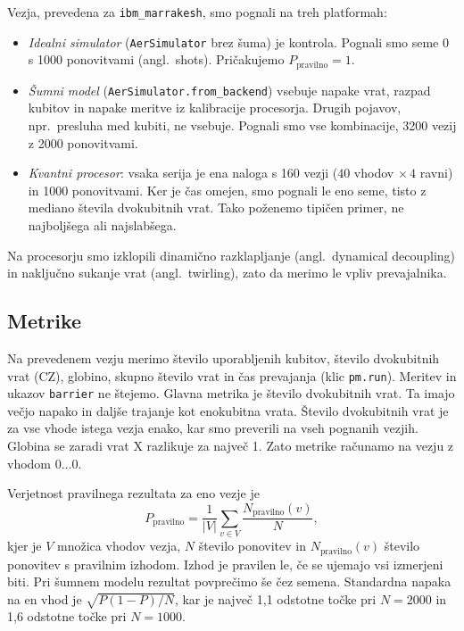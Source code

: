 \documentclass[graybox, envcountchap]{svmult}
\begin{document}
Vezja, prevedena za \texttt{ibm\_marrakesh},
smo pognali na treh platformah:
\begin{itemize}
\item \emph{Idealni simulator} (\texttt{AerSimulator} brez šuma) je kontrola.
Pognali smo seme 0 s 1000 ponovitvami (angl.\ shots).
Pričakujemo $P_\text{pravilno} = 1$.
\item \emph{Šumni model} (\texttt{AerSimulator.from\_backend})
vsebuje napake vrat, razpad kubitov in napake meritve
iz kalibracije procesorja.
Drugih pojavov, npr.\ presluha med kubiti, ne vsebuje.
Pognali smo vse kombinacije,
3200 vezij z 2000 ponovitvami.
\item \emph{Kvantni procesor}: vsaka serija je ena naloga
s 160 vezji ($40$ vhodov $\times\,4$ ravni) in 1000 ponovitvami.
Ker je čas omejen, smo pognali le eno seme,
tisto z mediano števila dvokubitnih vrat.
Tako poženemo tipičen primer, ne najboljšega ali najslabšega.
\end{itemize}
Na procesorju smo izklopili dinamično razklapljanje
(angl.\ dynamical decoupling)
in naključno sukanje vrat (angl.\ twirling), zato
da merimo le vpliv prevajalnika.


\subsection{Metrike}
\label{g10:sec:metrike}

Na prevedenem vezju merimo število uporabljenih kubitov,
število dvokubitnih vrat (CZ), globino,
skupno število vrat in čas prevajanja (klic \texttt{pm.run}).
Meritev in ukazov \texttt{barrier} ne štejemo.
Glavna metrika je število dvokubitnih vrat.
Ta imajo večjo napako in daljše trajanje kot enokubitna vrata.
Število dvokubitnih vrat je za vse vhode istega vezja enako,
kar smo preverili na vseh pognanih vezjih.
Globina se zaradi vrat X razlikuje za največ 1.
Zato metrike računamo na vezju z vhodom $0\ldots0$.

Verjetnost pravilnega rezultata za eno vezje je
\begin{equation}
P_\text{pravilno} = \frac{1}{|V|} \sum_{v \in V} \frac{N_\text{pravilno}(v)}{N} ,
\label{g10:eq:ppravilno}
\end{equation}
kjer je $V$ množica vhodov vezja, $N$ število ponovitev
in $N_\text{pravilno}(v)$ število ponovitev s pravilnim izhodom.
Izhod je pravilen le, če se ujemajo vsi izmerjeni biti.
Pri šumnem modelu rezultat povprečimo še čez semena.
Standardna napaka na en vhod je $\sqrt{P(1-P)/N}$,
kar je največ 1,1 odstotne točke pri $N = 2000$
in 1,6 odstotne točke pri $N = 1000$.
\end{document}

